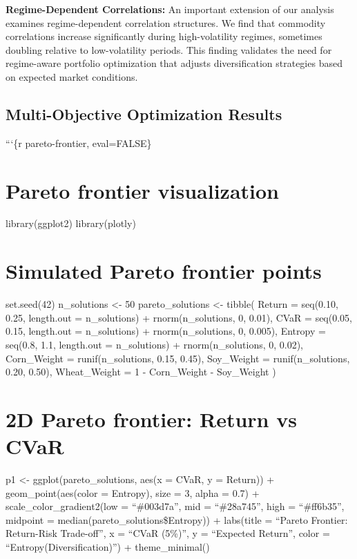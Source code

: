 \documentclass[
  10pt,
  a4paper,
]{article}
\begin{document}
\begin{tcolorbox}
\textbf{Regime-Dependent Correlations:} An important extension of our
analysis examines regime-dependent correlation structures. We find that
commodity correlations increase significantly during high-volatility
regimes, sometimes doubling relative to low-volatility periods. This
finding validates the need for regime-aware portfolio optimization that
adjusts diversification strategies based on expected market conditions.

\subsection{Multi-Objective Optimization
Results}\label{multi-objective-optimization-results}

```\{r pareto-frontier, eval=FALSE\}

\section{Pareto frontier
visualization}\label{pareto-frontier-visualization}

library(ggplot2) library(plotly)

\section{Simulated Pareto frontier
points}\label{simulated-pareto-frontier-points}

set.seed(42) n\_solutions \textless- 50 pareto\_solutions \textless-
tibble( Return = seq(0.10, 0.25, length.out = n\_solutions) +
rnorm(n\_solutions, 0, 0.01), CVaR = seq(0.05, 0.15, length.out =
n\_solutions) + rnorm(n\_solutions, 0, 0.005), Entropy = seq(0.8, 1.1,
length.out = n\_solutions) + rnorm(n\_solutions, 0, 0.02), Corn\_Weight
= runif(n\_solutions, 0.15, 0.45), Soy\_Weight = runif(n\_solutions,
0.20, 0.50), Wheat\_Weight = 1 - Corn\_Weight - Soy\_Weight )

\section{2D Pareto frontier: Return vs
CVaR}\label{d-pareto-frontier-return-vs-cvar}

p1 \textless- ggplot(pareto\_solutions, aes(x = CVaR, y = Return)) +
geom\_point(aes(color = Entropy), size = 3, alpha = 0.7) +
scale\_color\_gradient2(low = ``\#003d7a'', mid = ``\#28a745'', high =
``\#ff6b35'', midpoint = median(pareto\_solutions\$Entropy)) +
labs(title = ``Pareto Frontier: Return-Risk Trade-off'', x = ``CVaR
(5\%)'', y = ``Expected Return'', color =
``Entropy\n(Diversification)'') + theme\_minimal()


\end{tcolorbox}
\end{document}

